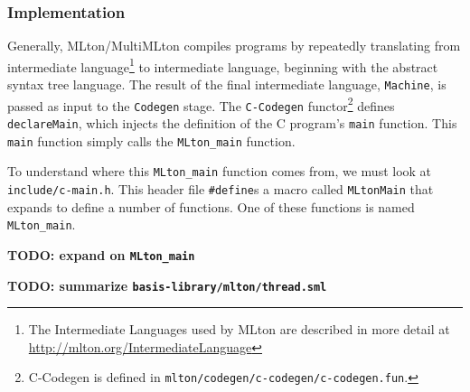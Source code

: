 \documentclass{article}
\begin{document}
\subsubsection{Implementation}

Generally, MLton/MultiMLton compiles programs by repeatedly
translating from intermediate language\footnote{The Intermediate
  Languages used by MLton are described in more detail at
  \url{http://mlton.org/IntermediateLanguage}} to intermediate
language, beginning with the abstract syntax tree language.  The
result of the final intermediate language, \texttt{Machine}, is passed
as input to the \texttt{Codegen} stage.  The \texttt{C-Codegen}
functor\footnote{C-Codegen is defined in
  \texttt{mlton/codegen/c-codegen/c-codegen.fun}.} defines
\texttt{declareMain}, which injects the definition of the C program's
\texttt{main} function.  This \texttt{main} function simply calls the
\texttt{MLton\_main} function.

To understand where this \texttt{MLton\_main} function comes from, we
must look at \texttt{include/c-main.h}. This header file
\texttt{\#define}s a macro called \texttt{MLtonMain} that expands to
define a number of functions. One of these functions is named
\texttt{MLton\_main}.

\textbf{TODO: expand on \texttt{MLton\_main}}

\textbf{TODO: summarize \texttt{basis-library/mlton/thread.sml}}

{}

\end{document}
